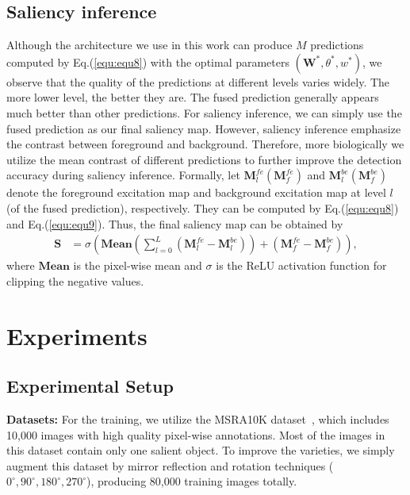 \documentclass[10pt,twocolumn,letterpaper]{article}
\begin{document}
\subsection{Saliency inference}
Although the architecture we use in this work can produce $M$ predictions computed by Eq.(\ref{equ:equ8}) with the optimal parameters $(\textbf{W}^{*},\theta^{*},w^{*})$, we observe that the quality of the predictions at different levels varies widely.
%
The more lower level, the better they are.
%
The fused prediction generally appears much better than other predictions.
%
For saliency inference, we can simply use the fused prediction as our final saliency map.
%
However, saliency inference emphasize the contrast between foreground and background.
%
Therefore, more biologically we utilize the mean contrast of different predictions to further improve the detection accuracy during saliency inference.
%
%
Formally, let $\textbf{M}_{l}^{fe} (\textbf{M}_{f}^{fe})$ and $\textbf{M}_{l}^{be} (\textbf{M}_{f}^{be})$ denote the foreground excitation map and background excitation map at level $l$ (of the fused prediction), respectively.
%
They can be computed by Eq.(\ref{equ:equ8}) and Eq.(\ref{equ:equ9}).
%
Thus, the final saliency map can be obtained by
\begin{align}
  \textbf{S} & = \sigma(\textbf{Mean}(\sum_{l=0}^{L}(\textbf{M}_{l}^{fe}-\textbf{M}_{l}^{be}))+(\textbf{M}_{f}^{fe}-\textbf{M}_{f}^{be})),
  \label{equ:equ10}
\end{align}
where $\textbf{Mean}$ is the pixel-wise mean and $\sigma$ is the ReLU activation function for clipping the negative values.
\section{Experiments}
%
\subsection{Experimental Setup}
\textbf{Datasets:} For the training, we utilize the MSRA10K dataset~\cite{ChengPAMI}, which includes 10,000 images with high quality pixel-wise annotations.
%
Most of the images in this dataset contain only one salient object.
%
To improve the varieties, we simply augment this dataset by mirror reflection and rotation techniques ($0^{\circ}, 90^{\circ}, 180^{\circ}, 270^{\circ}$), producing 80,000 training images totally.
%
\end{document}
